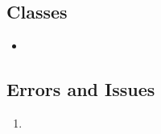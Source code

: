\documentclass[a4paper,11pt]{article}
\begin{document}
  
  
  \subsection{Classes}
  \begin{itemize}
   \item 
  \end{itemize}

  
  
  \subsection{Errors and Issues}
  \begin{enumerate}
   \item 
  \end{enumerate}

  
  
  


  

  
\end{document}
